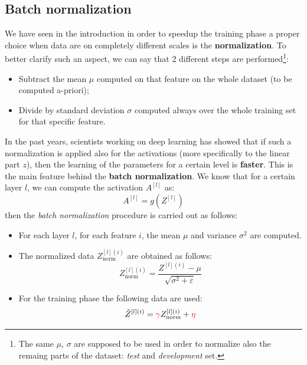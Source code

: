 \subsection{Batch normalization}
We have seen in the introduction in order to speedup the training phase a proper choice when data are on completely different scales is the \textbf{normalization}. To better clarify such an aspect, we can say that 2 different steps are performed\footnote{
    The same $\mu$, $\sigma$ are supposed to be used in order to normalize also the remaing parts of the dataset: \textit{test} and \textit{development} set.
}:
\begin{itemize}
    \itemsep-0.3em
    \item Subtract the mean $\mu$ computed on that feature on the whole dataset (to be computed a-priori); 
    \item Divide by standard deviation $\sigma$ computed always over the whole training set for that specific feature.
\end{itemize}
In the past years, scientists working on deep learning has showed that if such a normalization is applied also for the activations (more specifically to the linear part $z$), then the learning of the parameters for a certain level is \textbf{faster}. This is the main feature behind the \textbf{batch normalization}. We know that for a certain layer $l$, we can compute the activation $A^{[l]}$ as:
\begin{equation*}
    A^{[l]}=g(Z^{[l]})
\end{equation*}
then the \textit{batch normalization} procedure is carried out as follows:
\begin{itemize}
    \itemsep-0.3em
    \item For each layer $l$, for each feature $i$, the mean $\mu$ and variance $\sigma^2$ are computed.
    \item The normalized data $Z^{[l](i)}_{\text{norm}}$ are obtained as follows:
    \begin{equation*}
        Z^{[l](i)}_{\text{norm}}=\frac{
            Z^{[l](i)}-\mu
        }{
            \sqrt{\sigma^2+\varepsilon}
        }
    \end{equation*}
    \item For the training phase the following data are used:
    {\large{
        \begin{equation}\label{eq:batch_normalization}
            \tilde{Z}^{[l](i)}={\color{red}\gamma}{Z}^{[l](i)}_{\text{norm}}+{\color{red}\eta}
        \end{equation}
    }}
\end{itemize}
